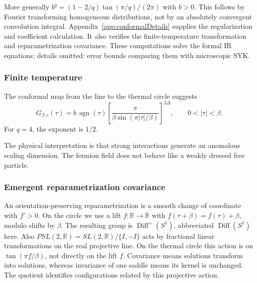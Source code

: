 \documentclass[11pt]{article}
\numberwithin{equation}{section}
\theoremstyle{exposition}
\theoremstyle{result}
\newcommand{\R}{\mathbb R}
\newcommand{\sgn}{\operatorname{sgn}}
\newcommand{\Diff}{\operatorname{Diff}}
\begin{document}
More generally $b^q=(1-2/q)\tan(\pi/q)/(2\pi)$ with $b>0$. This follows by Fourier transforming homogeneous distributions, not by an absolutely convergent convolution integral. Appendix~\ref{app:conformalDetails} supplies the regularization and coefficient calculation. It also verifies the finite-temperature transformation and reparametrization covariance. These computations solve the formal IR equations; details omitted: error bounds comparing them with microscopic SYK.

\subsubsection{Finite temperature}

The conformal map from the line to the thermal circle suggests
\begin{equation}
G_{\beta,c}(\tau)
=b\,\sgn(\tau)
\left[
\frac{\pi}{\beta\sin(\pi|\tau|/\beta)}
\right]^{2\Delta},
\qquad 0<|\tau|<\beta.
\label{eq:finiteTG}
\end{equation}
For $q=4$, the exponent is $1/2$.

The physical interpretation is that strong interactions generate an anomalous scaling dimension. The fermion field does not behave like a weakly dressed free particle.

\subsubsection{Emergent reparametrization covariance}


An orientation-preserving reparametrization is a smooth change of coordinate with $f'>0$. On the circle we use a lift $f:\R\to\R$ with $f(\tau+\beta)=f(\tau)+\beta$, modulo shifts by $\beta$. The resulting group is $\Diff^+(S^1)$, abbreviated $\Diff(S^1)$ here. Also $PSL(2,\R)=SL(2,\R)/\{I,-I\}$ acts by fractional linear transformations on the real projective line. On the thermal circle this action is on $\tan(\pi f/\beta)$, not directly on the lift $f$. Covariance means solutions transform into solutions, whereas invariance of one saddle means its kernel is unchanged. The quotient identifies configurations related by this projective action.
\end{document}
